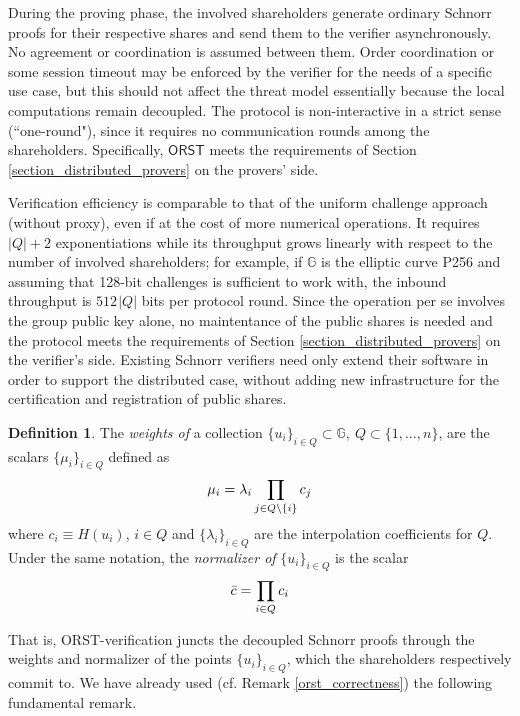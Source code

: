 \documentclass[psamsfonts, reqno]{amsart}
\theoremstyle{definition}
\newtheorem{defn}[thm]{Definition}
\theoremstyle{remark}
\numberwithin{equation}{section}
\begin{document}
During the proving phase,
the involved shareholders generate ordinary Schnorr
proofs for their respective shares
and send them to the verifier asynchronously.
No agreement or coordination is assumed between them.
Order coordination or some session timeout
may be enforced by the verifier for the needs of a specific use case,
but this should not affect the threat model essentially
because the local computations remain decoupled.
The protocol is non-interactive in a strict sense
(``one-round"), since it requires no
communication rounds among the shareholders.
Specifically, $\textsf{ORST}$ meets the requirements of
Section \ref{section_distributed_provers} on the provers' side.

Verification efficiency is comparable to that of the uniform
challenge approach (without proxy),
even if at the cost of more numerical operations.
It requires $|Q| + 2$ exponentiations
while its throughput grows linearly
with respect to the number of involved shareholders;
for example, if $\mathbb{G}$ is the elliptic curve P256 and
assuming that 128-bit challenges is sufficient to work with,
the inbound throughput is $512 \hspace{1pt} |Q|$ bits per protocol round.
Since the operation per se involves
the group public key alone, no maintentance of the public shares is
needed and the protocol meets
the requirements of Section \ref{section_distributed_provers}
on the verifier's side.
Existing Schnorr verifiers need only extend
their software in order to support the distributed case,
without adding new infrastructure
for the certification and registration of public shares.

\begin{defn}\label{orst_weights_definition}
The \textit{weights of} a collection
$\{u_i\}_{i \in Q} \subset \mathbb{G},\ Q \subset \{1, \dots, n\}$,
are the scalars
$\{\mu_i\}_{i \in Q}$
defined as
\vspace{+2pt}
\begin{equation}\label{orst_weights}
\mu_i =\lambda_i \prod_{j \in Q \setminus \{i\}} c_j
\vspace{5pt}
\end{equation}
where $c_i \equiv H(u_i)$, $i \in Q$ and
$\{\lambda_i\}_{i \in Q }$ are the interpolation
coefficients for $Q$.
Under the same notation,
the \textit{normalizer of} $\{u_i\}_{i \in Q}$ is the scalar
\vspace{5pt}
\begin{equation}\label{orst_normalizer}
\bar{c} = \prod_{i \in Q} c_i
\vspace{5pt}
\end{equation}
\end{defn}
\noindent
That is, \textsf{ORST}-verification juncts the decoupled
Schnorr proofs through the weights and normalizer
of the points $\{u_i\}_{i \in Q}$,
which the shareholders respectively commit to.
We have already used (cf. Remark \ref{orst_correctness})
the following fundamental remark.
\end{document}
